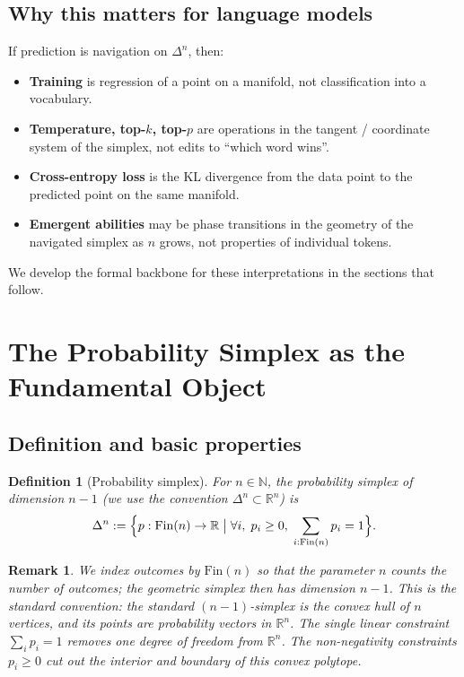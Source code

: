 \documentclass[11pt]{article}
\newtheorem{definition}[theorem]{Definition}
\newtheorem{remark}[theorem]{Remark}
\newcommand{\simplex}[1]{\Delta^{#1}}
\newcommand{\RR}{\mathbb{R}}
\newcommand{\NN}{\mathbb{N}}
\begin{document}
\subsection{Why this matters for language models}
\label{sec:why}

If prediction is navigation on $\simplex{n}$, then:
\begin{itemize}
\item \textbf{Training} is regression of a point on a manifold, not
classification into a vocabulary.
\item \textbf{Temperature, top-$k$, top-$p$} are operations in the tangent /
coordinate system of the simplex, not edits to ``which word wins''.
\item \textbf{Cross-entropy loss} is the KL divergence from the data point to
the predicted point on the same manifold.
\item \textbf{Emergent abilities} may be phase transitions in the geometry of
the navigated simplex as $n$ grows, not properties of individual tokens.
\end{itemize}
We develop the formal backbone for these interpretations in the sections that
follow.

\section{The Probability Simplex as the Fundamental Object}
\label{sec:simplex}

\subsection{Definition and basic properties}
\label{sec:simplex-def}

\begin{definition}[Probability simplex]
For $n\in\NN$, the \emph{probability simplex of dimension $n-1$} (we use the
convention $\simplex{n}\subset\RR^n$) is
\[
\simplex{n} := \Bigl\{ p : \mathrm{Fin}(n)\to\RR \;\big|\;
\forall i,\; p_i\ge 0,\; \sum_{i:\mathrm{Fin}(n)} p_i = 1 \Bigr\}.
\]
\end{definition}

\begin{remark}
We index outcomes by $\mathrm{Fin}(n)$ so that the parameter $n$ counts the
\emph{number of outcomes}; the geometric simplex then has dimension $n-1$.  This
is the standard convention: the standard $(n-1)$-simplex is the convex hull of
$n$ vertices, and its points are probability vectors in $\RR^n$.  The single
linear constraint $\sum_i p_i = 1$ removes one degree of freedom from $\RR^n$.
The non-negativity constraints $p_i\ge 0$ cut out the \emph{interior and
boundary} of this convex polytope.
\end{remark}
\end{document}
